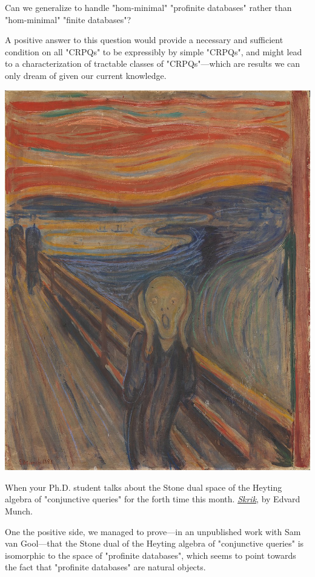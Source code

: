 \begin{question}
	Can we generalize 
	to handle "hom-minimal" "profinite databases" rather than
	"hom-minimal" "finite databases"?
\end{question}

A positive answer to this question would provide a necessary and sufficient condition
on all "CRPQs" to be expressibly by simple "CRPQs", and might
lead to a characterization of tractable classes of "CRPQs"---which are results we can only dream of
given our current knowledge.

\quFPTtractability*

\begin{marginfigure}[-10em]
	\centering
	\includegraphics[width=\linewidth]{fig/Munch.jpg}
	\caption{
		When your Ph.D. student talks about
		the Stone dual space of the Heyting algebra of "conjunctive queries" for the forth
		time this month.
		\href{https://commons.wikimedia.org/wiki/File:Edvard\_Munch,\_1893,\_The_Scream,\_oil,\_tempera\_and\_pastel\_on\_cardboard,\_91\_x\_73\_cm,\_National\_Gallery\_of\_Norway.jpg}{\emph{Skrik}},
		by Edvard Munch.
	}
\end{marginfigure}
One the positive side, we managed to prove---in an unpublished work with Sam van Gool---that
the Stone dual of the Heyting algebra of "conjunctive queries" is isomorphic
to the space of "profinite databases", which seems to point towards the fact
that "profinite databases" are natural objects.


